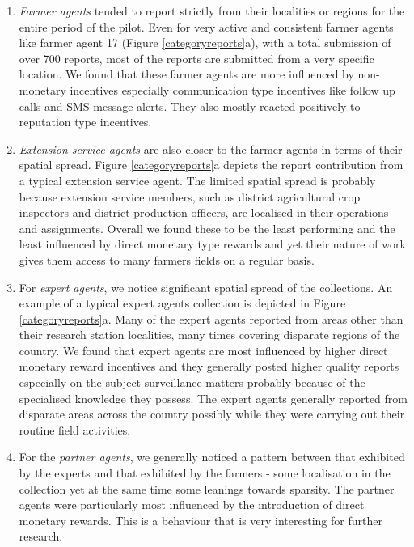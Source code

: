 \documentclass[letterpaper]{article} %
\begin{document}
\begin{enumerate}[-]
\item \emph{Farmer agents} tended to report strictly from their localities or regions for the entire period of the pilot. Even for very active and consistent farmer agents like farmer agent 17 (Figure \ref{categoryreports}a), with a total submission of over 700 reports, most of the reports are submitted from a very specific location. We found that these farmer agents are more influenced by non-monetary incentives especially communication type incentives like follow up calls and SMS message alerts. They also mostly reacted positively to reputation type incentives.

\item \emph{Extension service agents} are also closer to the farmer agents in terms of their spatial spread. Figure \ref{categoryreports}a depicts the report contribution from a typical extension service agent. The limited spatial spread is probably because extension service members, such as district agricultural crop inspectors and district production officers, are localised in their operations and assignments. Overall we found these to be the least performing and the least influenced by direct monetary type rewards and yet their nature of work gives them access to many farmers fields on a regular basis.

\item For \emph{expert agents}, we notice significant spatial spread of the collections. An example of a typical expert agents collection is depicted in Figure \ref{categoryreports}a. Many of the expert agents reported from areas other than their research station localities, many times covering disparate regions of the country. We found that expert agents are most influenced by higher direct monetary reward incentives and they generally posted higher quality reports especially on the subject surveillance matters probably because of the specialised knowledge they possess. The expert agents generally reported from disparate areas across the country possibly while they were carrying out their routine field activities.

\item For the \emph{partner agents}, we generally noticed a pattern between that exhibited by the experts and that exhibited by the farmers - some localisation in the collection yet at the same time some leanings towards sparsity. The partner agents were particularly most influenced by the introduction of direct monetary rewards. This is a behaviour that is very interesting for further research.
\end{enumerate}
\end{document}
